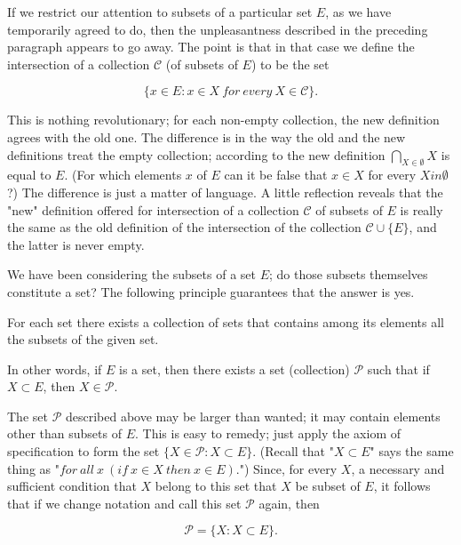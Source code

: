 If we restrict our attention to subsets of a particular set $E$, as we have temporarily agreed to do, then the unpleasantness described in the preceding paragraph appears to go away. The point is that in that case we define the intersection of a collection $ \mathcal{C} $ (of subsets of $E$) to be the set 

\begin{equation*}
\{ x \in E: x \in X \: for \: every \: X \in \mathcal{C} \}.
\end{equation*}

This is nothing revolutionary; for each non-empty collection, the new definition agrees with the old one. The difference is in the way the old and the new definitions treat the empty collection; according to the new definition  $\bigcap_{X \in \emptyset} X$ is equal to $E$. (For which elements $x$ of $E$ can it be false that $x \in X$ for every $X in \emptyset $?) The difference is just a matter of language. A little reflection reveals that the "new" definition offered for intersection of a collection $ \mathcal{C} $ of subsets of $E$ is really the same as the old definition of the intersection of the collection $ \mathcal{C} \cup \{ E \} $, and the latter is never empty. 

We have been considering the subsets of a set $E$; do those subsets themselves constitute a set? The following principle guarantees that the answer is yes.

\begin{named}  For each set there exists a collection of sets that contains among its elements all the subsets of the given set. 
\end{named}

In other words, if $E$ is a set, then there exists a set (collection) $ \mathcal{P} $ such that if $X \subset E$, then $X \in \mathcal{P}$.
 
The set $ \mathcal{P} $ described above may be larger than wanted; it may contain elements other than subsets of $E$. This is easy to remedy; just apply the axiom of specification to form the set $ \{ X \in \mathcal{P}: X \subset E \} $. (Recall that "$ X \subset E $"  says the same thing as "$for \: all \: x \:(if \: x \in X \: then \: x \in E) $.") Since, for every $X$, a necessary and sufficient condition that $X$ belong to this set that $X$ be subset of $E$, it follows that if we change notation and call this set $ \mathcal{P} $ again, then 

\begin{equation*}
\mathcal{P} = \{ X : X \subset E \} .
\end{equation*}

